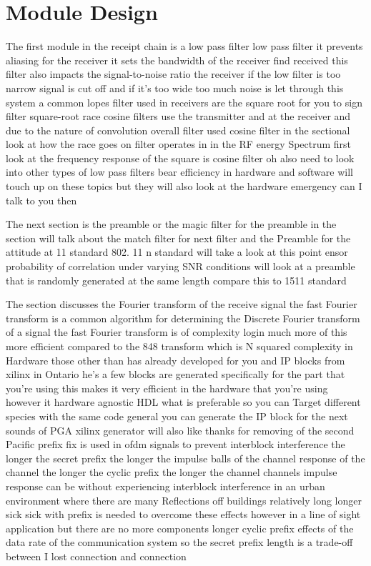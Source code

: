 \documentclass[]{book}
\begin{document}
\section{Module Design}
The first module in the receipt chain is a low pass filter low pass filter it prevents aliasing for the receiver it sets the bandwidth of the receiver find received this filter also impacts the signal-to-noise ratio the receiver if the low filter is too narrow signal is cut off and if it's too wide too much noise is let through this system a common lopes filter used in receivers are the square root for you to sign filter square-root race cosine filters use the transmitter and at the receiver and due to the nature of convolution overall filter used cosine filter in the sectional look at how the race goes on filter operates in in the RF energy Spectrum first look at the frequency response of the square is cosine filter oh also need to look into other types of low pass filters bear efficiency in hardware and software will touch up on these topics but they will also look at the hardware emergency can I talk to you then

The next section is the preamble or the magic filter for the preamble in the section will talk about the match filter for next filter and the Preamble for the attitude at 11 standard 802. 11 n standard will take a look at this point ensor probability of correlation under varying SNR conditions will look at a preamble that is randomly generated at the same length compare this to 1511 standard

The section discusses the Fourier transform of the receive signal the fast Fourier transform is a common algorithm for determining the Discrete Fourier transform of a signal the fast Fourier transform is of complexity login much more of this more efficient compared to the 848 transform which is N squared complexity in Hardware those other than has already developed for you and IP blocks from xilinx in Ontario he's a few blocks are generated specifically for the part that you're using this makes it very efficient in the hardware that you're using however it hardware agnostic HDL what is preferable so you can Target different species with the same code general you can generate the IP block for the next sounds of PGA xilinx generator will also like thanks for removing of the second Pacific prefix fix is used in ofdm signals to prevent interblock interference the longer the secret prefix the longer the impulse balls of the channel response of the channel the longer the cyclic prefix the longer the channel channels impulse response can be without experiencing interblock interference in an urban environment where there are many Reflections off buildings relatively long longer sick sick with prefix is needed to overcome these effects however in a line of sight application but there are no more components longer cyclic prefix effects of the data rate of the communication system so the secret prefix length is a trade-off between I lost connection and connection
\end{document}
